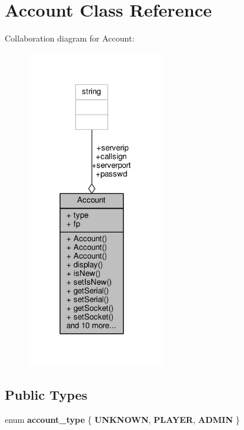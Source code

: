 \hypertarget{classAccount}{}\section{Account Class Reference}
\label{classAccount}


Collaboration diagram for Account\+:
\nopagebreak
\begin{figure}[H]
\begin{center}
\leavevmode
\includegraphics[width=170pt]{dd/d1d/classAccount__coll__graph}
\end{center}
\end{figure}
\subsection*{Public Types}
\begin{DoxyCompactItemize}
\item 
enum {\bfseries account\+\_\+type} \{ {\bfseries U\+N\+K\+N\+O\+WN}, 
{\bfseries P\+L\+A\+Y\+ER}, 
{\bfseries A\+D\+M\+IN}
 \}\hypertarget{classAccount_ae50212ba656822f3c77cfdb3da7f55ae}{}\label{classAccount_ae50212ba656822f3c77cfdb3da7f55ae}

\end{DoxyCompactItemize}
